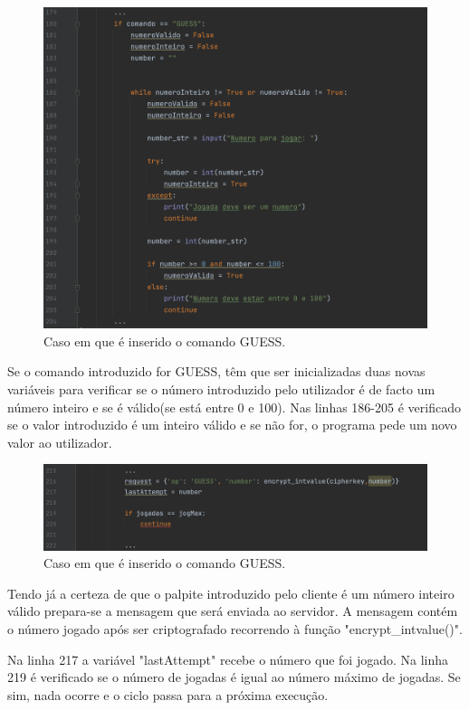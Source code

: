 \documentclass{report}
\begin{document}
\begin{figure}[H]
        \centering
        \includegraphics[scale=0.43]{guess1}      
        \caption{Caso em que é inserido o comando GUESS.}
\end{figure}
Se o comando introduzido for GUESS, têm que ser inicializadas duas novas variáveis para verificar se o número introduzido pelo utilizador é de facto um número inteiro e se é válido(se está entre 0 e 100).
Nas linhas 186-205 é verificado se o valor introduzido é um inteiro válido e se não for, o programa pede um novo valor ao utilizador.
\begin{figure}[H]
        \centering
        \includegraphics[scale=0.43]{guess2}      
        \caption{Caso em que é inserido o comando GUESS.}
\end{figure}
Tendo já a certeza de que o palpite introduzido pelo cliente é um número inteiro válido prepara-se a mensagem que será enviada ao servidor. A mensagem contém o número jogado após ser criptografado recorrendo à função "encrypt\_intvalue()".

Na linha 217 a variável "lastAttempt" recebe o número que foi jogado.
Na linha 219 é verificado se o número de jogadas é igual ao número máximo de jogadas. Se sim, nada ocorre e o ciclo passa para a próxima execução.
\end{document}
